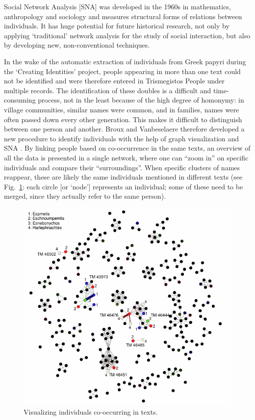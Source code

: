 \documentclass[amsthm,ebook]{saparticle}
\begin{document}
Social Network Analysis [SNA] was developed in the 1960s in mathematics, anthropology and sociology and measures
structural forms of relations between individuals. It has huge potential for future historical research, not only by
applying `traditional' network analysis for the study of social interaction, but also by developing new,
non-conventional techniques.

In the wake of the automatic extraction of individuals from Greek papyri during the `Creating Identities' project,
people appearing in more than one text could not be identified and were therefore entered in Trismegistos People under
multiple records. The identification of these doubles is a difficult and time-consuming process, not in the least
because of the high degree of homonymy: in village communities, similar names were common, and in families, names were
often passed down every other generation. This makes it difficult to distinguish between one person and another. Broux
and Vanbeselaere therefore developed a new procedure to identify individuals with the help of graph visualization and
SNA \citep{BrouxVanbeselaere}. By linking people based on co-occurrence in the same texts, an overview of
all the data is presented in a single network, where one can ``zoom in'' on specific individuals and compare their
``surroundings''. When specific clusters of names reappear, these are likely the same individuals mentioned in different
texts (see Fig.~\ref{fig:1}: each circle [or `node'] represents an individual; some of these need to be merged, since they
actually refer to the same person). 




\begin{figure}[!bp]
\centering
 \includegraphics[width=\columnwidth]{EAGLE2016FullPaperBroux-img001.jpg}
\caption{Visualizing individuals co-occurring in texts. }
\label{fig:1}
\end{figure}
\end{document}
